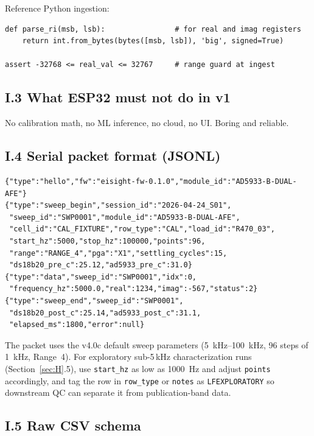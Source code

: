 \documentclass[11pt,a4paper]{article}
\begin{document}
Reference Python ingestion:
\begin{verbatim}
def parse_ri(msb, lsb):                # for real and imag registers
    return int.from_bytes(bytes([msb, lsb]), 'big', signed=True)

assert -32768 <= real_val <= 32767     # range guard at ingest
\end{verbatim}

\subsection{I.3 What ESP32 must not do in v1}

\begin{rulebox}
No calibration math, no ML inference, no cloud, no UI. Boring and reliable.
\end{rulebox}

\subsection{I.4 Serial packet format (JSONL)}

\begin{verbatim}
{"type":"hello","fw":"eisight-fw-0.1.0","module_id":"AD5933-B-DUAL-AFE"}
{"type":"sweep_begin","session_id":"2026-04-24_S01",
 "sweep_id":"SWP0001","module_id":"AD5933-B-DUAL-AFE",
 "cell_id":"CAL_FIXTURE","row_type":"CAL","load_id":"R470_03",
 "start_hz":5000,"stop_hz":100000,"points":96,
 "range":"RANGE_4","pga":"X1","settling_cycles":15,
 "ds18b20_pre_c":25.12,"ad5933_pre_c":31.0}
{"type":"data","sweep_id":"SWP0001","idx":0,
 "frequency_hz":5000.0,"real":1234,"imag":-567,"status":2}
{"type":"sweep_end","sweep_id":"SWP0001",
 "ds18b20_post_c":25.14,"ad5933_post_c":31.1,
 "elapsed_ms":1800,"error":null}
\end{verbatim}

\noindent The packet uses the v4.0c default sweep parameters (\SIrange{5}{100}{\kilo\hertz}, 96 steps of \SI{1}{\kilo\hertz}, Range~4). For exploratory sub-5\,kHz characterization runs (Section~\ref{sec:H}.5), use \texttt{start\_hz} as low as \SI{1000}{\hertz} and adjust \texttt{points} accordingly, and tag the row in \texttt{row\_type} or \texttt{notes} as \texttt{LFEXPLORATORY} so downstream QC can separate it from publication-band data.

\subsection{I.5 Raw CSV schema}
\end{document}
